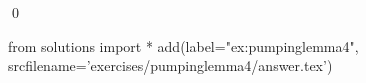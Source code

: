 
\begin{ex} 
  \label{ex:pumpinglemma4}
  
  \qed
\end{ex} 
\begin{python0}
from solutions import *
add(label="ex:pumpinglemma4",
    srcfilename='exercises/pumpinglemma4/answer.tex') 
\end{python0}
